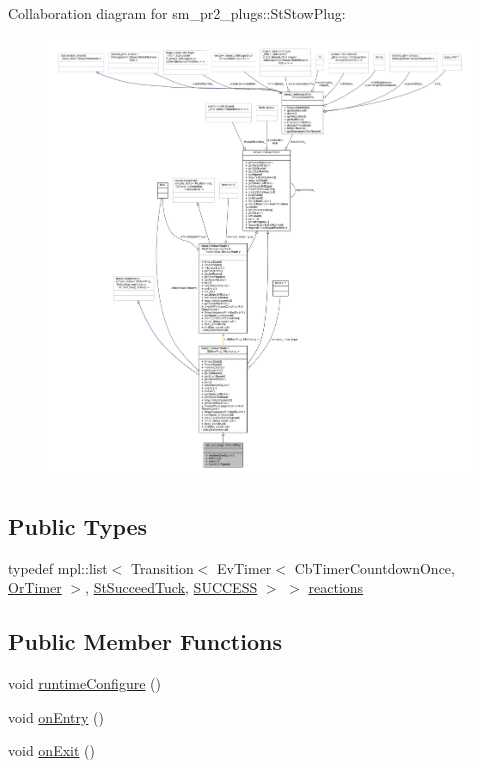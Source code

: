 Collaboration diagram for sm\+\_\+pr2\+\_\+plugs\+:\+:St\+Stow\+Plug\+:
\nopagebreak
\begin{figure}[H]
\begin{center}
\leavevmode
\includegraphics[width=350pt]{structsm__pr2__plugs_1_1StStowPlug__coll__graph}
\end{center}
\end{figure}
\subsection*{Public Types}
\begin{DoxyCompactItemize}
\item 
typedef mpl\+::list$<$ Transition$<$ Ev\+Timer$<$ Cb\+Timer\+Countdown\+Once, \hyperlink{classsm__pr2__plugs_1_1OrTimer}{Or\+Timer} $>$, \hyperlink{structsm__pr2__plugs_1_1StSucceedTuck}{St\+Succeed\+Tuck}, \hyperlink{classSUCCESS}{S\+U\+C\+C\+E\+SS} $>$ $>$ \hyperlink{structsm__pr2__plugs_1_1StStowPlug_a30e66bd99b3feb400c8896aec05e5c4b}{reactions}
\end{DoxyCompactItemize}
\subsection*{Public Member Functions}
\begin{DoxyCompactItemize}
\item 
void \hyperlink{structsm__pr2__plugs_1_1StStowPlug_a7a8c96a9affcf5e333fc0e96575141ec}{runtime\+Configure} ()
\item 
void \hyperlink{structsm__pr2__plugs_1_1StStowPlug_af7ecd886b25ba936701f57ee7618883d}{on\+Entry} ()
\item 
void \hyperlink{structsm__pr2__plugs_1_1StStowPlug_ac30e0c1205f0f02cddc7687fd9bf1c49}{on\+Exit} ()
\end{DoxyCompactItemize}

